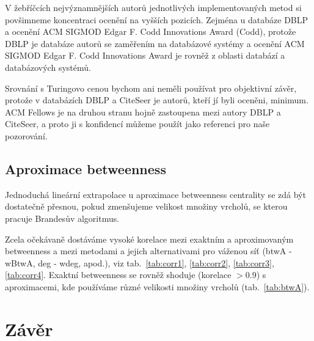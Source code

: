 \documentclass{bakalarka}
\begin{document}
V žebříčcích nejvýznamnějších autorů jednotlivých implementovaných metod si
povšimneme koncentraci ocenění na vyšších pozicích. Zejména u databáze DBLP a
ocenění ACM SIGMOD Edgar F. Codd Innovations Award (Codd), protože DBLP je
databáze autorů se zaměřením na databázové systémy a ocenění ACM SIGMOD Edgar
F. Codd Innovations Award je rovněž z oblasti databází a databázových systémů.

Srovnání s Turingovo cenou bychom ani neměli používat pro objektivní závěr,
protože v databázích DBLP a CiteSeer je autorů, kteří jí byli oceněni, minimum.
ACM Fellows je na druhou stranu hojně zastoupena mezi autory DBLP a CiteSeer, a
proto ji s konfidencí můžeme použít jako referenci pro naše pozorování.


\section{Aproximace betweenness}
Jednoduchá lineární extrapolace u aproximace betweenness centrality se zdá být
dostatečně přesnou, pokud zmenšujeme velikost množiny vrcholů, se kterou
pracuje Brandesův algoritmus.

Zcela očekávaně dostáváme vysoké korelace mezi exaktním a aproximovaným
betweenness a mezi metodami a jejich alternativami pro váženou síť (btwA -
wBtwA, deg - wdeg, apod.), viz tab.~\ref{tab:corr1}, \ref{tab:corr2},
\ref{tab:corr3}, \ref{tab:corr4}. Exaktní betweenness se rovněž shoduje
(korelace $> 0.9$) s aproximacemi, kde používáme různé velikosti množiny
vrcholů (tab.~\ref{tab:btwA}).

\chapter{Závěr}





\appendix

\newpage
\end{document}
